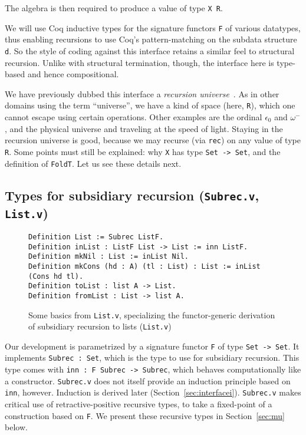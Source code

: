 \documentclass[a4paper,USenglish]{lipics-v2021}
\begin{document}
\noindent The algebra is then required to produce a value of type \verb|X R|.

We will use Coq inductive types for the signature functors \verb|F| of
various datatypes, thus enabling recursions to use Coq's
pattern-matching on the subdata structure \verb|d|.  So the style of
coding against this interface retains a similar feel to structural
recursion.  Unlike with structural termination, though, the interface
here is type-based and hence compositional.  

We have previously dubbed this interface a \emph{recursion
universe}~\cite{stump20}.  As in other domains using the term
``universe'', we have a kind of space (here, \verb|R|), which one
cannot escape using certain operations.  Other examples are the
ordinal $\epsilon_0$ and $\omega^-$, and the physical universe and
traveling at the speed of light.  Staying in the recursion universe is
good, because we may recurse (via \verb|rec|) on any value of type
\verb|R|.  Some points must still be explained: why \verb|X| has type
\verb|Set -> Set|, and the definition of \verb|FoldT|.  Let us see
these details next.

\subsection{Types for subsidiary recursion (\texttt{Subrec.v}, \texttt{List.v})}


\begin{figure}
\begin{verbatim}
Definition List := Subrec ListF.
Definition inList : ListF List -> List := inn ListF.
Definition mkNil : List := inList Nil.
Definition mkCons (hd : A) (tl : List) : List := inList (Cons hd tl).
Definition toList : list A -> List.
Definition fromList : List -> list A.
\end{verbatim}
  \caption{Some basics from \texttt{List.v}, specializing the functor-generic derivation of subsidiary recursion to lists (\texttt{List.v})}
  \label{fig:listf}
\end{figure}

Our development is parametrized by a signature functor \verb|F| of
type \verb|Set -> Set|.  It implements \verb|Subrec : Set|, which is
the type to use for subsidiary recursion.  This type comes with
\verb|inn : F Subrec -> Subrec|, which behaves computationally like a
constructor.  \verb|Subrec.v| does not itself provide an induction
principle based on \verb|inn|, however.  Induction is derived later
(Section~\ref{sec:interfacei}). \verb|Subrec.v| makes critical use of
retractive-positive recursive types, to take a fixed-point of a
construction based on \verb|F|.  We present these recursive types in
Section~\ref{sec:mu} below.
\end{document}
